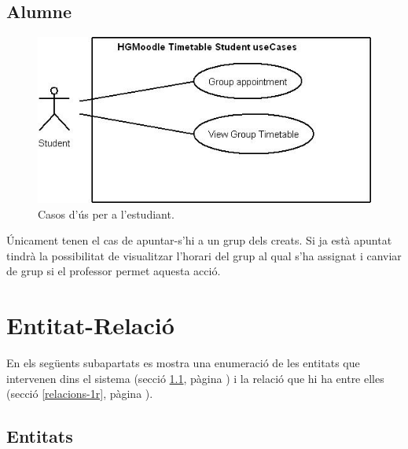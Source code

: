 \documentclass[a4paper]{report}  %
\begin{document}
\subsection{Alumne}
		\begin{figure}[H] %
		\begin{center}
		\includegraphics[width=14cm,keepaspectratio]{img/UseCases-Student-1r.jpg}
		\caption[List caption]{Casos d'ús per a l'estudiant.}
		\label{fig:UseCases-Student-1r}
		\end{center}
		\end{figure}
Únicament tenen el cas de apuntar-s'hi a un grup dels creats. Si ja està apuntat tindrà la possibilitat de visualitzar l'horari del grup al qual s'ha assignat i canviar de grup si el professor permet aquesta acció.

\section{Entitat-Relació}

En els següents subapartats es mostra una enumeració de les entitats que intervenen dins el sistema (secció \ref{entitats-1r}, pàgina \pageref{entitats-1r}) i la relació que hi ha entre elles (secció \ref{relacions-1r}, pàgina \pageref{relacions-1r}).
\subsection{Entitats}\label{entitats-1r}
\end{document}
